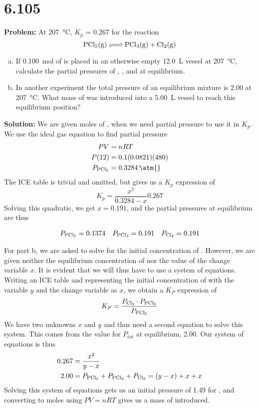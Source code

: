 \documentclass[11 pt]{article}
\begin{document}
    \section*{6.105}
    \begin{problemBox}
        \textbf{Problem:} At \SI{207}{\celsius}, $K_p$ = \SI{0.267}{\atm} for the reaction
        $$\ce{PCl5(g) <=> PCl3(g) + Cl2(g)}$$
        \begin{enumerate}[a)]
            \item If \SI{0.100}{\mole} of  is placed in an otherwise empty \SI{12.0}{\liter} vessel at \SI{207}{\celsius}, calculate the partial pressures of , , and  at equilibrium.
            \item In another experiment the total pressure of an equilibrium mixture is \SI{2.00}{\atm{}} at \SI{207}{\celsius}. What mass of  was introduced into a \SI{5.00}{\liter} vessel to reach this equilibrium position?
        \end{enumerate} 
    \end{problemBox}
    \textbf{Solution:} We are given moles of , when we need partial pressure to use it in $K_p$. We use the ideal gas equation to find partial pressure
    \begin{align*}
        PV &= nRT \\
        P(12) &= 0.1(0.0821)(480) \\
        P_{\ce{PCl5}} &= \SI{0.3284}{\atm{}}
    \end{align*}
    The ICE table is trivial and omitted, but gives us a $K_p$ expression of 
    $$K_p = \frac{x^2}{0.3284 - x} 0.267$$
    Solving this quadratic, we get $x = 0.191$, and the partial pressures at equilibrium are thus
    \begin{answerBox}
    \begin{align*}
        P_{\ce{PCl5}} = 0.1374 && P_{\ce{PCl3}} = 0.191 && P_{\ce{Cl2}} = 0.191
    \end{align*}
    \end{answerBox}
    For part b, we are asked to solve for the initial concentration of . However, we are given neither
    the equilibrium concentration of  nor the value of the change variable $x$. It is evident
    that we will thus have to use a system of equations. Writing an ICE table and representing the initial
    concentration of  with the variable $y$ and the change variable as $x$, we obtain a $K_P$ expression of
    $$ K_P = \frac{P_{\ce{Cl2}} \cdot P_{\ce{PCl3}}}{P_{\ce{PCl5}}}$$
    We have two unknowns $x$ and $y$ and thus need a second equation to solve this system. This comes from
    the value for $P_{tot}$ at equilibrium, \SI{2.00}{\atm{}}. Our system of equations is thus
\begin{align*}
  0.267 &= \frac{x^2}{y-x} \\
  2.00 &= P_{\ce{PCl5}} + P_{\ce{PCl3}} + P_{\ce{Cl2}}= (y-x) + x + x 
\end{align*}
Solving this system of equations gets us an initial pressure of \SI{1.49}{\atm{}} for , and converting to moles
using $PV = nRT$ gives us a mass of  introduced. 
\end{document}
